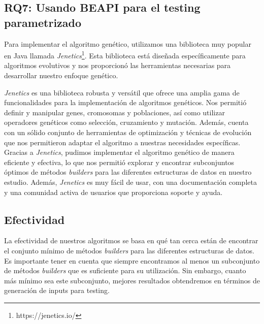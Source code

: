 \subsection{RQ7: Usando BEAPI para el testing parametrizado}













Para implementar el algoritmo genético, utilizamos una biblioteca muy popular en Java llamada \emph{Jenetics}\footnote{https://jenetics.io/}. Esta biblioteca está diseñada específicamente para algoritmos evolutivos y nos proporcionó las herramientas necesarias para desarrollar nuestro enfoque genético.

\emph{Jenetics} es una biblioteca robusta y versátil que ofrece una amplia gama de funcionalidades para la implementación de algoritmos genéticos. Nos permitió definir y manipular genes, cromosomas y poblaciones, así como utilizar operadores genéticos como selección, cruzamiento y mutación. Además, cuenta con un sólido conjunto de herramientas de optimización y técnicas de evolución que nos permitieron adaptar el algoritmo a nuestras necesidades específicas.
Gracias a \emph{Jenetics}, pudimos implementar el algoritmo genético de manera eficiente y efectiva, lo que nos permitió explorar y encontrar subconjuntos óptimos de métodos \emph{builders} para las diferentes estructuras de datos en nuestro estudio. Además, \emph{Jenetics} es muy fácil de usar, con una documentación completa y una comunidad activa de usuarios que proporciona soporte y ayuda. 



\subsection{Efectividad}

La efectividad de nuestros algoritmos se basa en qué tan cerca están de encontrar el conjunto mínimo de métodos \emph{builders} para las diferentes estructuras de datos. Es importante tener en cuenta que siempre encontramos al menos un subconjunto de métodos \emph{builders} que es suficiente para su utilización. Sin embargo, cuanto más mínimo sea este subconjunto, mejores resultados obtendremos en términos de generación de inputs para testing.

